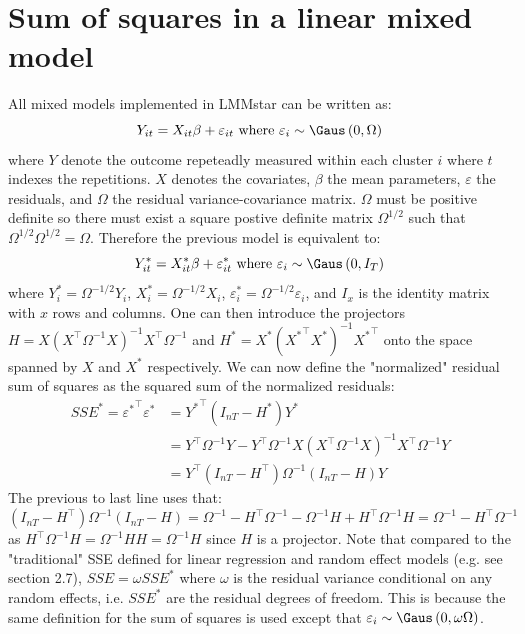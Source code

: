\documentclass[12pt]{article}
\newcommand\trans[1]{{#1}^\intercal}%
\begin{document}
\section{Sum of squares in a linear mixed model}
\label{SM:sumSquares}
All mixed models implemented in LMMstar can be written as:
\[ Y_{it} = X_{it}\beta + \varepsilon_{it} \text{ where } \varepsilon_{i} \sim \Gaus\left(0,\Omega\right)\]
where \(Y\) denote the outcome repeteadly measured within each cluster
\(i\) where \(t\) indexes the repetitions. \(X\) denotes the
covariates, \(\beta\) the mean parameters, \(\varepsilon\) the
residuals, and \(\Omega\) the residual variance-covariance matrix.
\(\Omega\) must be positive definite so there must exist a square
postive definite matrix \(\Omega^{1/2}\) such that
\(\Omega^{1/2}\Omega^{1/2} = \Omega\). Therefore the previous model is
equivalent to:
\[ Y^*_{it} = X^*_{it}\beta + \varepsilon^*_{it} \text{ where } \varepsilon_{i} \sim \Gaus\left(0,I_T\right)\]
where \(Y^*_{i} = \Omega^{-1/2} Y_{i}\), \(X^*_{i} = \Omega^{-1/2}
X_{i}\), \(\varepsilon^*_{i} = \Omega^{-1/2} \varepsilon_{i}\), and
\(I_x\) is the identity matrix with \(x\) rows and columns. One can
then introduce the projectors \(H= X \left(\trans{X}\Omega^{-1}
X\right)^{-1}\trans{X} \Omega^{-1}\) and \(H^*= X^*
\left(\trans{X^*}X^*\right)^{-1}\trans{X^*}\) onto the space spanned
by \(X\) and \(X^*\) respectively. We can now define the "normalized"
residual sum of squares as the squared sum of the normalized
residuals:
\begin{align*}
SSE^* = \trans{\varepsilon^*} \varepsilon^* &= \trans{Y^*} (I_{nT}-H^*) Y^* \\
&= \trans{Y} \Omega^{-1} Y - \trans{Y} \Omega^{-1} X \left(\trans{X}\Omega^{-1} X\right)^{-1} \trans{X} \Omega^{-1} Y \\
&= \trans{Y} (I_{nT}-\trans{H}) \Omega^{-1} (I_{nT}-H) Y 
\end{align*}
The previous to last line uses that: \((I_{nT}-\trans{H}) \Omega^{-1}
(I_{nT}-H)= \Omega^{-1} - \trans{H} \Omega^{-1} - \Omega^{-1}H +
\trans{H} \Omega^{-1} H = \Omega^{-1} - \trans{H}\Omega^{-1}\) as
\(\trans{H} \Omega^{-1} H = \Omega^{-1}HH=\Omega^{-1}H\) since \(H\)
is a projector. Note that compared to the "traditional" SSE defined
for linear regression and random effect models (e.g. see
\cite{christensen2002plane} section 2.7), \(SSE=\omega SSE^{*}\) where
\(\omega\) is the residual variance conditional on any random effects,
i.e. \(SSE^{*}\) are the residual degrees of freedom. This is because
the same definition for the sum of squares is used except that
\(\varepsilon_{i} \sim \Gaus\left(0,\omega\Omega\right)\).
\end{document}
